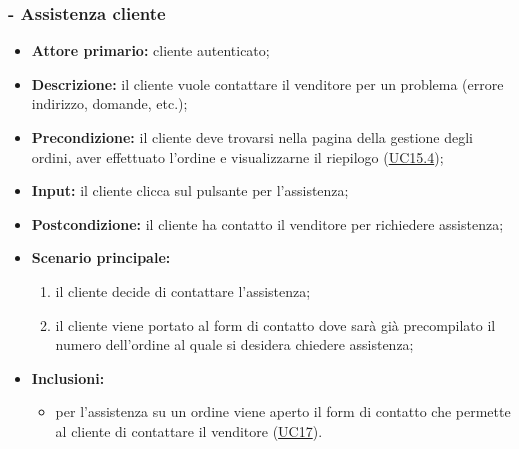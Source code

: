 \subsubsection{ - Assistenza cliente}
\begin{itemize}
    \item \textbf{Attore primario:} cliente autenticato;
    \item \textbf{Descrizione:} il cliente vuole contattare il venditore per un problema (errore indirizzo, domande, etc.);
    \item \textbf{Precondizione:} il cliente deve trovarsi nella pagina della gestione degli ordini, aver effettuato l'ordine e visualizzarne il riepilogo (\hyperref[UC15.4]{UC15.4});
    \item \textbf{Input:} il cliente clicca sul pulsante per l'assistenza;
    \item \textbf{Postcondizione:} il cliente ha contatto il venditore per richiedere assistenza;
    \item \textbf{Scenario principale:}
          \begin{enumerate}
              \item il cliente decide di contattare l'assistenza;
              \item il cliente viene portato al form di contatto dove sarà già precompilato il numero dell'ordine al quale si desidera chiedere assistenza;
          \end{enumerate}
    \item \textbf{Inclusioni:}
          \begin{itemize}
              \item per l'assistenza su un ordine viene aperto il form di contatto che permette al cliente di contattare il venditore (\hyperref[UC17]{UC17}).
          \end{itemize}
\end{itemize}

\stepsubUserCase
